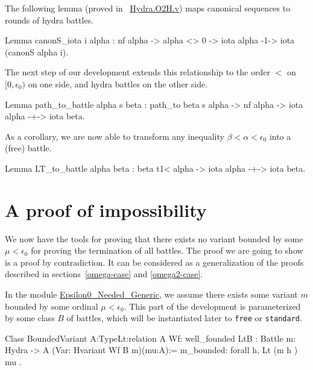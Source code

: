 The following lemma (proved in ~\href{../theories/html/hydras.Hydra.O2H.html}{Hydra.O2H.v}) maps  canonical sequences to rounds of hydra battles.


\label{lemma:canonS-iota}

\begin{Coqsrc}
Lemma canonS_iota i alpha :
    nf alpha -> alpha <> 0 ->
    iota alpha -1-> iota (canonS alpha i).
\end{Coqsrc}
                

The next step of our development extends this relationship to
the order $<$ on $[0,\epsilon_0)$ on one side, and hydra battles on the other side.


\begin{Coqsrc}
Lemma path_to_battle alpha s beta :
  path_to  beta  s alpha -> nf alpha ->
  iota alpha -+-> iota beta.
\end{Coqsrc}

As a corollary, we are now able to transform any inequality $\beta<\alpha<\epsilon_0$ into a (free) battle.

\begin{Coqsrc}
Lemma LT_to_battle alpha beta :
    beta t1< alpha ->  iota alpha -+-> iota beta.
\end{Coqsrc}

\section{A  proof of impossibility}

We now have  the tools for proving that  there exists no variant bounded by some $\mu<\epsilon_0$ for proving the termination   of all battles. The proof we are going to show is a proof by contradiction. It  can
 be considered as a generalization of the
proofs described in  sections~\vref{omega-case} and \vref{omega2-case}.



In the module \href{../theories/html/hydras.Hydra.Epsilon0_Needed_Generic.html}{Epsilon0\_Needed\_Generic}, we assume there exists some variant $m$ bounded by some ordinal $\mu<\epsilon_0$. This part of the development is parameterized by some class $B$ of battles, which will be instantiated later to \texttt{free} or \texttt{standard}.




\begin{Coqsrc}
Class BoundedVariant {A:Type}{Lt:relation A}
      {Wf: well_founded Lt}{B : Battle}
      {m: Hydra -> A} (Var: Hvariant  Wf  B m)(mu:A):=
  {
  m_bounded: forall h, Lt (m h ) mu
  }.
\end{Coqsrc}

